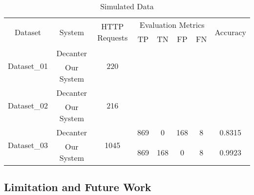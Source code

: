 \begin{table}[!h]
\centering
\caption{Simulated Data}
\label{tbl:db_02l}
\begin{tabular}{|c|c|c|c|c|c|c|c|}
\hline
\multirow{2}{*}{Dataset}     & \multirow{2}{*}{System} & \multirow{2}{*}{HTTP Requests} & \multicolumn{4}{c|}{Evaluation Metrics} & \multirow{2}{*}{Accuracy} \\ \cline{4-7}
                             &                         &                                & TP       & TN       & FP       & FN     &                           \\ \hline
\multirow{2}{*}{Dataset\_01} & Decanter                & \multirow{2}{*}{220}           &          &          &          &        &                           \\ \cline{2-2} \cline{4-8} 
                             & Our System              &                                &          &          &          &        &                           \\ \hline
\multirow{2}{*}{Dataset\_02} & Decanter                & \multirow{2}{*}{216}           &          &          &          &        &                           \\ \cline{2-2} \cline{4-8} 
                             & Our System              &                                &          &          &          &        &                           \\ \hline
\multirow{2}{*}{Dataset\_03} & Decanter                & \multirow{2}{*}{1045}          & 869      & 0        & 168      & 8      & 0.8315                    \\ \cline{2-2} \cline{4-8} 
                             & Our System              &                                & 869      & 168      & 0        & 8      & 0.9923                    \\ \hline
\end{tabular}
\end{table}


\subsection{Limitation and Future Work}
